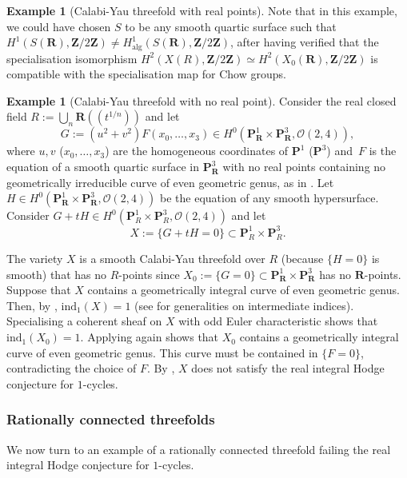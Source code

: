 \documentclass[JEP,XML,SOM,Unicode]{cedram}
\newcommand{\lpr}{(\!(}
\newcommand{\rpr}{)\!)}
\theoremstyle{plain}
\theoremstyle{definition}
\newtheorem{example}[thm]{Example}
\numberwithin{equation}{section}
\newcommand{\alg}{{\mathrm{alg}}}
\newcommand{\sO}{{\mathscr O}}
\renewcommand{\P}{{\mathbf P}}
\newcommand{\R}{{\mathbf R}}
\newcommand{\Z}{{\mathbf Z}}
\newcommand{\elw}{\mathrm{ind}}
\begin{document}
\begin{example}[Calabi-Yau threefold with real points]
Note that in this example, we could have chosen $S$ to be any smooth quartic surface such that $H^1(S(\R),\Z/2\Z)\neq H^1_{\alg}(S(\R),\Z/2\Z)$, after having verified that the specialisation isomorphism $H^2(X(R),\Z/2\Z)\simeq H^2(X_0(\R),\Z/2\Z)$ is compatible with the specialisation map for Chow groups.
\end{example}

\begin{example}[Calabi-Yau threefold with no real point]
\label{ex:cexCYsanspoint}
Consider the real closed field $R:=\bigcup_n\R\lpr t^{1/n}\rpr$ and let
\[
G:= (u^2+v^2)F(x_0,\dots,x_3)\in H^0(\P^1_\R\times\P^3_\R,\sO(2,4)),
\]
where $u,v$ (\resp $x_0,\dots,x_3$) are the homogeneous coordinates of $\P^1$ (\resp $\P^3$) and~$F$ is the equation of a smooth quartic surface in $\P^3_{\R}$ with no real points containing no geometrically irreducible curve of even geometric genus, as in \cite[Ex.\,\ref*{BW1-ex:kollar quartique sans point}]{BW1}. Let $H\in H^0(\P^1_\R\times\P^3_\R,\sO(2,4))$ be the equation of any smooth hypersurface. Consider $G+tH\in H^0(\P^1_R\times\P^3_R,\sO(2,4))$ and let
\[
X:=\{G+tH=0\}\subset \P^1_R\times\P^3_R.
\]

The variety $X$ is a smooth Calabi-Yau threefold over $R$ (because $\{H=0\}$ is smooth) that has no $R$-points since $X_0:=\{G=0\}\subset\P^1_\R\times\P^3_\R$ has no $\R$\nobreakdash-points.
Suppose that $X$ contains a geometrically integral curve of even geometric genus. Then, by
\cite[Cor.\,\ref*{BW1-cor:what is elw1}]{BW1}, $\elw_1(X)=1$ (see \cite[\S\ref*{BW1-subsec:elw}]{BW1} for generalities on intermediate indices). Specialising a coherent sheaf on $X$ with odd Euler characteristic shows that $\elw_1(X_0)=1$. Applying \cite[Cor.\,\ref*{BW1-cor:what is elw1}]{BW1} again shows that $X_0$ contains a geo\-metrically integral curve of even geometric genus. This curve must be contained in $\{F=0\}$, contradicting the choice of $F$.
By \cite[Cor.\,\ref*{BW1-cor:IHC pour solides RC ou CY}]{BW1}, $X$ does not satisfy the real integral Hodge conjecture for $1$-cycles.
\end{example}

\subsubsection{Rationally connected threefolds}
\label{sss:RCR}

We now turn to an example of a rationally connected threefold failing the real integral Hodge conjecture for $1$-cycles.
\end{document}
